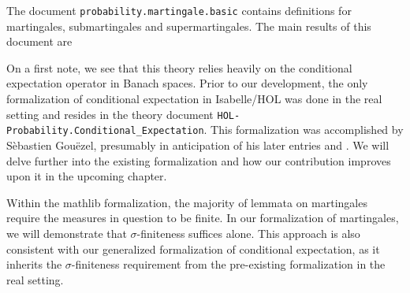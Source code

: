 The document \texttt{probability.martingale.basic} contains definitions for martingales, submartingales and supermartingales. The main results of this document are

On a first note, we see that this theory relies heavily on the conditional expectation operator in Banach spaces. Prior to our development, the only formalization of conditional expectation in Isabelle/HOL was done in the real setting and resides in the theory document \texttt{HOL-Probability.Conditional\_Expectation}. This formalization was accomplished by S\`ebastien Gou\"ezel, presumably in anticipation of his later entries \cite{Ergodic_Theory-AFP} and \cite{Lp-AFP}. We will delve further into the existing formalization and how our contribution improves upon it in the upcoming chapter.

Within the \textsf{mathlib} formalization, the majority of lemmata on martingales require the measures in question to be finite. In our formalization of martingales, we will demonstrate that $\sigma$-finiteness suffices alone. This approach is also consistent with our generalized formalization of conditional expectation, as it inherits the $\sigma$-finiteness requirement from the pre-existing formalization in the real setting.

